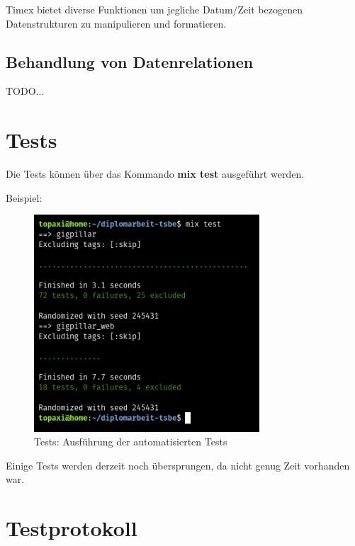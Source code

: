 Timex bietet diverse Funktionen um jegliche Datum/Zeit bezogenen Datenstrukturen
zu manipulieren und formatieren.

\subsection{Behandlung von Datenrelationen}

TODO...

\clearpage
\section{Tests}\label{RealisierungsTests}

Die Tests können über das Kommando \textbf{mix test} ausgeführt werden.

\noindent{}Beispiel:

\begin{figure}[!htb]
  \centering
  \includegraphics[width=0.75\textwidth]{realisierung/test-run.png}
  \caption{Tests: Ausführung der automatisierten Tests}
\end{figure}

\noindent{}Einige Tests werden derzeit noch übersprungen, da nicht genug Zeit vorhanden
war.



\clearpage
\section{Testprotokoll}\label{RealisierungsTestprotokoll}

\setcounter{acceptancetest}{0}

